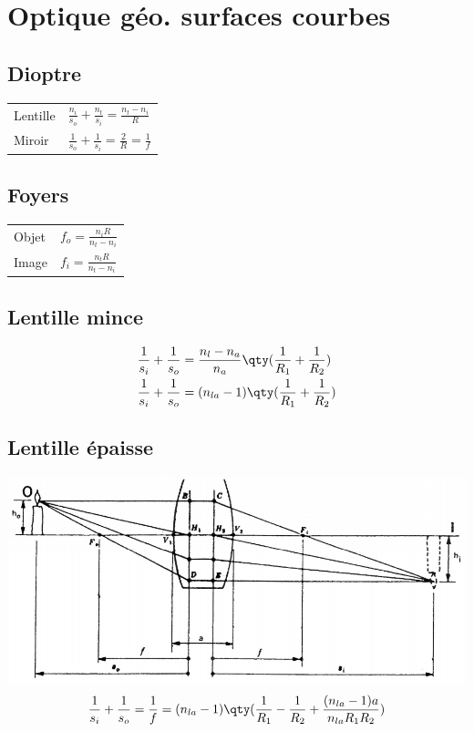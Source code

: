 \section{Optique géo. surfaces courbes}
\vspace{-2\baselineskip}
\subsection{Dioptre}
\begin{tabular}{ll}
    Lentille &  \(\frac{n_i}{s_o}+\frac{n_t}{s_i}=\frac{n_t-n_i}{R}\)\\[8pt]
    Miroir & \(\frac{1}{s_o}+\frac{1}{s_i}=\frac{2}{R}=\frac{1}{f}\)
\end{tabular}


\subsection{Foyers}
\begin{tabular}{ll}
    Objet & \(f_o = \frac{n_i R}{n_t-n_i} \) \\
    Image & \(f_i = \frac{n_t R}{n_t-n_i} \)
\end{tabular}

\subsection{Lentille mince}
\begin{align*}
    \frac{1}{s_i}+\frac{1}{s_o}&=\frac{n_l-n_a}{n_a}\qty(\frac{1}{R_1}+\frac{1}{R_2})\\
    \frac{1}{s_i}+\frac{1}{s_o}&=(n_{la}-1)\qty(\frac{1}{R_1}+\frac{1}{R_2})
\end{align*}

\subsection{Lentille épaisse}
\includegraphics[width=.45\textwidth]{fig/thk_lens.PNG}
\[\frac{1}{s_i}+\frac{1}{s_o}=\frac{1}{f} = (n_{la}-1)\qty(\frac{1}{R_1}-\frac{1}{R_2}+\frac{(n_{la}-1)a}{n_{la}R_1R_2})\]
